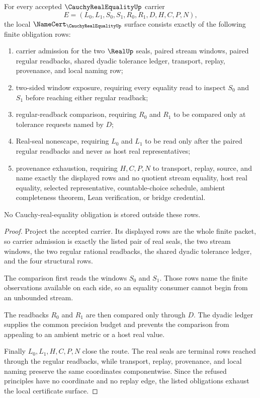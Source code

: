 \begin{theorem}
\label{thm:cauchy-real-equality-namecert-obligations}
For every accepted $\CauchyRealEqualityUp$ carrier
$$
E=(L_0,L_1,S_0,S_1,R_0,R_1,D,H,C,P,N),
$$
the local $\NameCert_{\CauchyRealEqualityUp}$ surface consists exactly of the following finite obligation rows:
\begin{enumerate}
\item carrier admission for the two $\RealUp$ seals, paired stream windows, paired regular readbacks, shared dyadic tolerance ledger, transport, replay, provenance, and local naming row;
\item two-sided window exposure, requiring every equality read to inspect $S_0$ and $S_1$ before reaching either regular readback;
\item regular-readback comparison, requiring $R_0$ and $R_1$ to be compared only at tolerance requests named by $D$;
\item Real-seal nonescape, requiring $L_0$ and $L_1$ to be read only after the paired regular readbacks and never as host real representatives;
\item provenance exhaustion, requiring $H,C,P,N$ to transport, replay, source, and name exactly the displayed rows and no quotient stream equality, host real equality, selected representative, countable-choice schedule, ambient completeness theorem, Lean verification, or bridge credential.
\end{enumerate}
No Cauchy-real-equality obligation is stored outside these rows.
\end{theorem}
\begin{proof}
Project the accepted carrier. Its displayed rows are the whole finite packet, so carrier admission is exactly the listed pair of real seals, the two stream windows, the two regular rational readbacks, the shared dyadic tolerance ledger, and the four structural rows.

The comparison first reads the windows $S_0$ and $S_1$. Those rows name the finite observations available on each side, so an equality consumer cannot begin from an unbounded stream.

The readbacks $R_0$ and $R_1$ are then compared only through $D$. The dyadic ledger supplies the common precision budget and prevents the comparison from appealing to an ambient metric or a host real value.

Finally $L_0,L_1,H,C,P,N$ close the route. The real seals are terminal rows reached through the regular readbacks, while transport, replay, provenance, and local naming preserve the same coordinates componentwise. Since the refused principles have no coordinate and no replay edge, the listed obligations exhaust the local certificate surface.
\end{proof}

